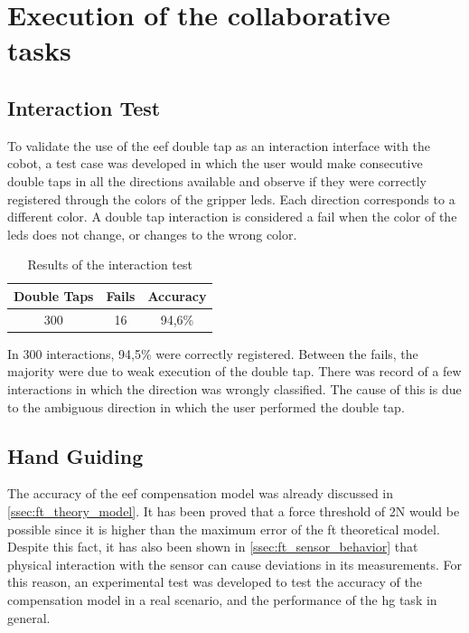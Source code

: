 \section{Execution of the collaborative tasks}

\subsection{Interaction Test}

\par To validate the use of the \ac{eef} double tap as an interaction interface with the cobot, a test case was developed in which the user would make consecutive double taps in all the directions available and observe if they were correctly registered through the colors of the gripper \acsp{led}. Each direction corresponds to a different color. A double tap interaction is considered a fail when the color of the \acsp{led} does not change, or changes to the wrong color.

\begin{table}[h]
    \centering
    \begin{tabular}{|c|c|c|}
    \hline
    \textbf{Double Taps} & \textbf{Fails} & \textbf{Accuracy} \\ \hline
    300 & 16 & 94,6\% \\ \hline
    \end{tabular}
    \caption{Results of the interaction test}
    \label{tab:interaction_test}
\end{table}

\par In 300 interactions, 94,5\% were correctly registered. Between the fails, the majority were due to weak execution of the double tap. There was record of a few interactions in which the direction was wrongly classified. The cause of this is due to the ambiguous direction in which the user performed the double tap.

\subsection{Hand Guiding}

\par The accuracy of the \ac{eef} compensation model was already discussed in \autoref{ssec:ft_theory_model}. It has been proved that a force threshold of 2N would be possible since it is higher than the maximum error of the \ac{ft} theoretical model. Despite this fact, it has also been shown in \autoref{ssec:ft_sensor_behavior} that physical interaction with the sensor can cause deviations in its measurements. For this reason, an experimental test was developed to test the accuracy of the compensation model in a real scenario, and the performance of the \ac{hg} task in general.


